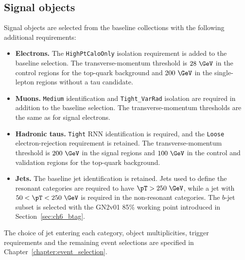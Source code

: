 \subsection{Signal objects}

Signal objects are selected from the baseline collections with the following additional requirements:
\begin{itemize}
    \item \textbf{Electrons.} The \texttt{HighPtCaloOnly} isolation requirement is added to the baseline selection. The transverse-momentum threshold is $28~\GeV$ in the control regions for the top-quark background and $200~\GeV$ in the single-lepton regions without a tau candidate.
    \item \textbf{Muons.} \texttt{Medium} identification and \texttt{Tight\_VarRad} isolation are required in addition to the baseline selection. The transverse-momentum thresholds are the same as for signal electrons.
    \item \textbf{Hadronic taus.} \texttt{Tight} RNN identification is required, and the \texttt{Loose} electron-rejection requirement is retained. The transverse-momentum threshold is $200~\GeV$ in the signal regions and $100~\GeV$ in the control and validation regions for the top-quark background.
    \item \textbf{Jets.} The baseline jet identification is retained. Jets used to define the resonant categories are required to have $\pT>250~\GeV$, while a jet with $50<\pT<250~\GeV$ is required in the non-resonant categories. The $b$-jet subset is selected with the GN2v01 85\% working point introduced in Section~\ref{sec:ch6_btag}.
\end{itemize}
The choice of jet entering each category, object multiplicities, trigger requirements and the remaining event selections are specified in Chapter~\ref{chapter:event_selection}.
